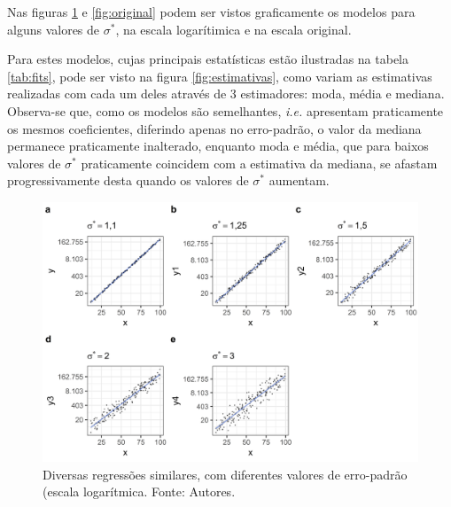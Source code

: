 \documentclass[a4paper, 12pt]{article}
\begin{document}
Nas figuras \ref{fig:log} e \ref{fig:original} podem ser vistos
graficamente os modelos para alguns valores de \(\sigma^*\), na escala
logarítimica e na escala original.

Para estes modelos, cujas principais estatísticas estão ilustradas na
tabela \ref{tab:fits}, pode ser visto na figura \ref{fig:estimativas},
como variam as estimativas realizadas com cada um deles através de 3
estimadores: moda, média e mediana. Observa-se que, como os modelos são
semelhantes, \emph{i.e.} apresentam praticamente os mesmos coeficientes,
diferindo apenas no erro-padrão, o valor da mediana permanece
praticamente inalterado, enquanto moda e média, que para baixos valores
de \(\sigma^*\) praticamente coincidem com a estimativa da mediana, se
afastam progressivamente desta quando os valores de \(\sigma^*\)
aumentam.

\begin{figure}[H]

{\centering \includegraphics[width=1\linewidth]{images/log-1} 

}

\caption{Diversas regressões similares, com diferentes valores de erro-padrão (escala logarítmica. Fonte: Autores.}\label{fig:log}
\end{figure}
\end{document}
